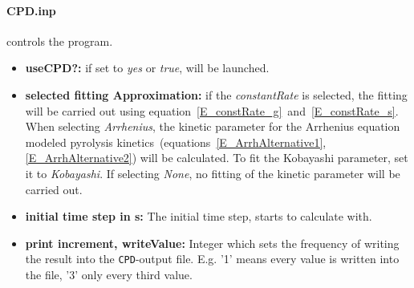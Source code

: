 \paragraph{CPD.inp} controls the \CPD program.
\begin{itemize}
 \item \textbf{useCPD?:} if set to \emph{yes} or \emph{true}, \CPD will be launched.
 \item \textbf{selected fitting Approximation:} if the \emph{constantRate} is selected, the fitting will be carried out using equation~\ref{E_constRate_g}~and~\ref{E_constRate_s}. When selecting \emph{Arrhenius}, the kinetic parameter for the Arrhenius equation modeled pyrolysis kinetics~(equations~\ref{E_ArrhAlternative1},\ref{E_ArrhAlternative2}) will be calculated. To fit the Kobayashi parameter, set it to \emph{Kobayashi}. If selecting \emph{None}, no fitting of the kinetic parameter will be carried out.
 \item \textbf{initial time step in s:} The initial time step, \CPD starts to calculate with.
\item \textbf{print increment, writeValue:} Integer which sets the frequency of writing the result into the \texttt{CPD}-output file. E.g. '1' means every value is written into the file, '3' only every third value.
\end{itemize}

